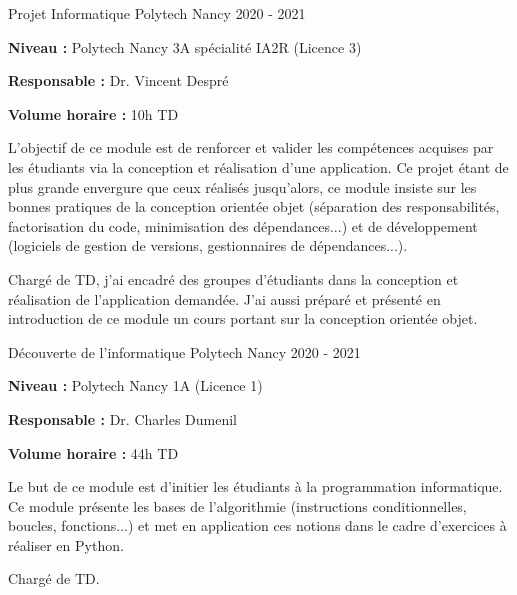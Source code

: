 \documentclass[12pt, a4paper]{awesome-cv}
\begin{document}
\begin{cventries}
  \cventry
  {Projet Informatique}
  {Polytech Nancy}
  {}
  {2020 - 2021}
  {
    \begin{cvitems}
      \item {\textbf{Niveau : } Polytech Nancy 3A spécialité IA2R (Licence 3)}
      \item {\textbf{Responsable : } Dr. Vincent Despré}
      \item {\textbf{Volume horaire : } 10h TD}
    \end{cvitems}
  }

  \begin{cvparagraph}
    L'objectif de ce module est de renforcer et valider les compétences acquises par les étudiants via la conception et réalisation d'une application. Ce projet étant de plus grande envergure que ceux réalisés jusqu'alors, ce module insiste sur les bonnes pratiques de la conception orientée objet (séparation des responsabilités, factorisation du code, minimisation des dépendances...) et de développement (logiciels de gestion de versions, gestionnaires de dépendances...).
  \end{cvparagraph}

  \begin{cvparagraph}
    Chargé de TD, j'ai encadré des groupes d'étudiants dans la conception et réalisation de l'application demandée.
    J'ai aussi préparé et présenté en introduction de ce module un cours portant sur la conception orientée objet.
  \end{cvparagraph}

  \cventry
  {Découverte de l'informatique}
  {Polytech Nancy}
  {}
  {2020 - 2021}
  {
    \begin{cvitems}
      \item {\textbf{Niveau : } Polytech Nancy 1A (Licence 1)}
      \item {\textbf{Responsable : } Dr. Charles Dumenil}
      \item {\textbf{Volume horaire : } 44h TD}
    \end{cvitems}
  }

  \begin{cvparagraph}
    Le but de ce module est d'initier les étudiants à la programmation informatique.
    Ce module présente les bases de l'algorithmie (instructions conditionnelles, boucles, fonctions...) et met en application ces notions dans le cadre d'exercices à réaliser en Python.
  \end{cvparagraph}

  \begin{cvparagraph}
    Chargé de TD.
  \end{cvparagraph}


\end{cventries}
\end{document}
